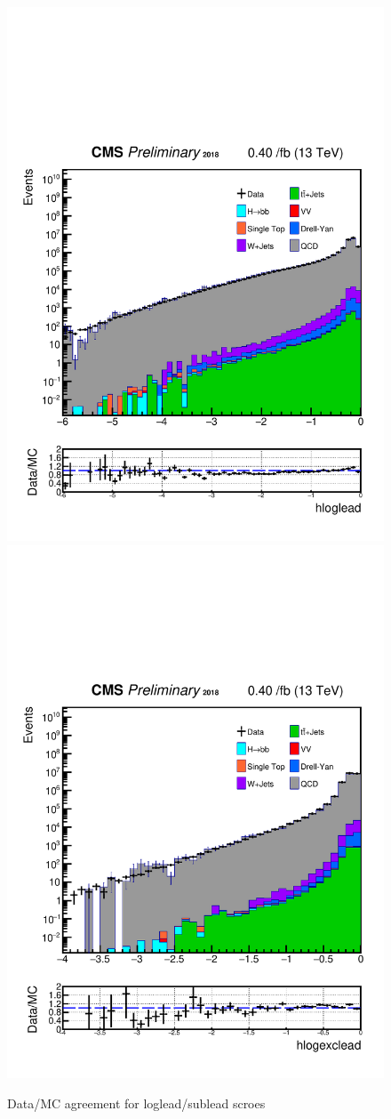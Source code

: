 \begin{figure}[h!]
  \caption{Data/MC agreement for loglead/sublead scroes}
  \label{fig:DataMCscore}
  \centering
  \includegraphics[width=0.47\linewidth]{figs/Data_AnalysisNoteplot_MS-15_ctauS-10_hloglead.pdf}
  \includegraphics[width=0.47\linewidth]{figs/Data_AnalysisNoteplot_MS-15_ctauS-10_hlogexclead.pdf}
\end{figure}



